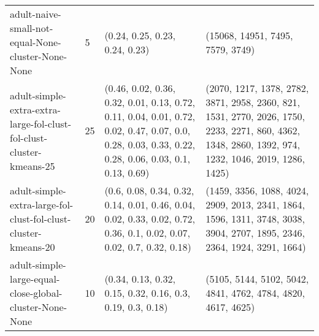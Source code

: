 \begin{longtable}{llll}
                                                           adult-naive-small-not-equal-None-cluster-None-None &              5 &                                                                                                                                                                                                                                                                            (0.24, 0.25, 0.23, 0.24, 0.23) &                                                                                                                                                                                                                                                                          (15068, 14951, 7495, 7579, 3749) \\
                                         adult-simple-extra-extra-large-fol-clust-fol-clust-cluster-kmeans-25 &             25 &                                                                                                                                                      (0.46, 0.02, 0.36, 0.32, 0.01, 0.13, 0.72, 0.11, 0.04, 0.01, 0.72, 0.02, 0.47, 0.07, 0.0, 0.28, 0.03, 0.33, 0.22, 0.28, 0.06, 0.03, 0.1, 0.13, 0.69) &                                                                                                                                                       (2070, 1217, 1378, 2782, 3871, 2958, 2360, 821, 1531, 2770, 2026, 1750, 2233, 2271, 860, 4362, 1348, 2860, 1392, 974, 1232, 1046, 2019, 1286, 1425) \\
                                               adult-simple-extra-large-fol-clust-fol-clust-cluster-kmeans-20 &             20 &                                                                                                                                                                                     (0.6, 0.08, 0.34, 0.32, 0.14, 0.01, 0.46, 0.04, 0.02, 0.33, 0.02, 0.72, 0.36, 0.1, 0.02, 0.07, 0.02, 0.7, 0.32, 0.18) &                                                                                                                                                                                  (1459, 3356, 1088, 4024, 2909, 2013, 2341, 1864, 1596, 1311, 3748, 3038, 3904, 2707, 1895, 2346, 2364, 1924, 3291, 1664) \\
                                                      adult-simple-large-equal-close-global-cluster-None-None &             10 &                                                                                                                                                                                                                                                (0.34, 0.13, 0.32, 0.15, 0.32, 0.16, 0.3, 0.19, 0.3, 0.18) &                                                                                                                                                                                                                                              (5105, 5144, 5102, 5042, 4841, 4762, 4784, 4820, 4617, 4625) \\

\end{longtable}
